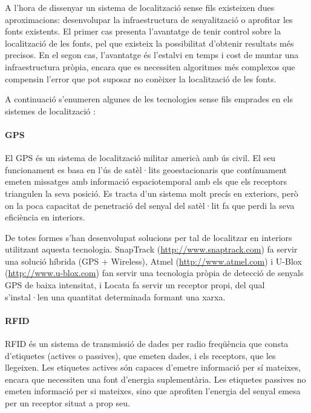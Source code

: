 A l'hora de dissenyar un sistema de localització sense fils existeixen dues aproximacions: desenvolupar la infraestructura de senyalització o aprofitar les fonts existents. El primer cas presenta l'avantatge de tenir control sobre la localització de les fonts, pel que existeix la possibilitat d'obtenir resultats més precisos. En el segon cas, l'avantatge és l'estalvi en temps i cost de muntar una infraestructura pròpia, encara que es necessiten algoritmes més complexos que compensin l'error que pot suposar no conèixer la localització de les fonts.

A continuació s'enumeren algunes de les tecnologies sense fils emprades en els sistemes de localització \cite{liu}:

\paragraph{GPS}

El GPS és un sistema de localització militar americà amb ús civil. El seu funcionament es basa en l’ús de satèl·lits geoestacionaris que contínuament emeten missatges amb informació espaciotemporal amb els que els receptors triangulen la seva posició. Es tracta d’un sistema molt precís en exteriors, però on la poca capacitat de penetració del senyal del satèl·lit fa que perdi la seva eficiència en interiors.

De totes formes s'han desenvolupat solucions per tal de localitzar en interiors utilitzant aquesta tecnologia. SnapTrack (\url{http://www.snaptrack.com}) fa servir una solució híbrida (GPS + Wireless), Atmel (\url{http://www.atmel.com}) i U-Blox (\url{http://www.u-blox.com}) fan servir una tecnologia pròpia de detecció de senyals GPS de baixa intensitat, i Locata \cite{barnes} fa servir un receptor propi, del qual s'instal·len una quantitat determinada formant una xarxa.

\paragraph{RFID}

RFID és un sistema de transmissió de dades per radio freqüència que consta d'etiquetes (actives o passives), que emeten dades, i els receptors, que les llegeixen. Les etiquetes actives són capaces d’emetre informació per sí mateixes, encara que necessiten una font d'energia suplementària. Les etiquetes passives no emeten informació per si mateixes, sino que aprofiten l'energia del senyal emesa per un receptor situat a prop seu.

